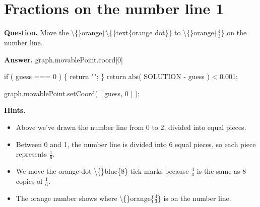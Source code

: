 \documentclass{article}
\begin{document}
\section*{Fractions on the number line 1}
\textbf{Question.} Move the \textbackslash\{\}orange\{\textbackslash\{\}text\{orange dot\}\} to
                \textbackslash\{\}orange\{$\frac{4}{3}$\} on the number line.

\textbf{Answer.} graph.movablePoint.coord[0] 
                
                    if ( guess === 0 ) \{
                        return "";
                    \}
                    return abs( SOLUTION - guess ) < 0.001;
                
                
                    graph.movablePoint.setCoord( [ guess, 0 ] );

\textbf{Hints.}
\begin{itemize}
  \item Above we've drawn the number line from 0 to 2, divided into equal pieces.
  \item Between 0 and 1, the number line is divided into 6 equal pieces,
                    so each piece represents $\frac{1}{6}$.
  \item We move the orange dot \textbackslash\{\}blue\{8\} tick marks because $\frac{4}{3}$
                        is the same as 8 copies of $\frac{1}{6}$.
  \item The orange number shows where \textbackslash\{\}orange\{$\frac{4}{3}$\} is on the number line.
\end{itemize}
\end{document}
